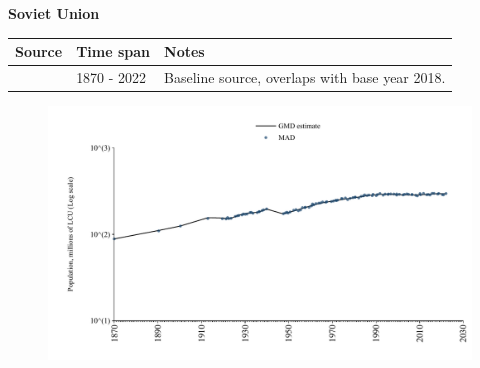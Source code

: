 \documentclass[12pt,a4paper,landscape]{article}
\begin{document}
\begin{adjustbox}{max totalsize={\paperwidth}{\paperheight},center}
\begin{minipage}[t][\textheight][t]{\textwidth}
\vspace*{0.5cm}
{}
\begin{center}
{\Large\bfseries Soviet Union}
\end{center}
\vspace{0.5cm}
\begin{table}[H]
\centering
\small
\begin{tabular}{|l|l|l|}
\hline
\textbf{Source} & \textbf{Time span} & \textbf{Notes} \\
\hline
\rowcolor{white}\cite{MAD}& 1870 - 2022 &Baseline source, overlaps with base year 2018.\\
\hline
\end{tabular}
\end{table}
\begin{figure}[H]
\centering
\includegraphics[width=\textwidth,height=0.6\textheight,keepaspectratio]{graphs/SUN_pop.pdf}
\end{figure}
\end{minipage}
\end{adjustbox}
\end{document}
